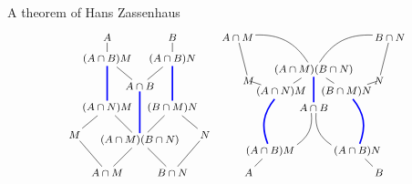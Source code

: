 \documentclass[8pt, handout]{beamer}
\begin{document}
\begin{frame}{A theorem of Hans Zassenhaus}
  \[
  \begin{tikzpicture}[scale=.6]
    \begin{scope}[scale=1,shorten >= -2pt, shorten <= -2pt]
      \tikzstyle{every node}=[font=\footnotesize]
      \node (AM) at (-1.5,0) {$A\cap M$};
      \node (BN) at (1.5,0) {$B\cap N$};
      \node (AMBN) at (0,1.5) {$(A\cap M)(B\cap N)$};
      \node (M) at (-3,1.75) {$M$};
      \node (N) at (3,1.75) {$N$};
      \node (BMN) at (1.5,3) {$(B\cap M)N$};
      \node (ANM) at (-1.5,3) {$(A\cap N)M$};
      \node (AB) at (0,4) {$A\cap B$};
      \node (ABM) at (-1.5,5.25) {$(A\cap B)M$};
      \node (ABN) at (1.5,5.25) {$(A\cap B)N$};
      \node (A) at (-1.5,6.25) {$A$};
      \node (B) at (1.5,6.25) {$B$};
      \draw (AM) to (M); \draw (BN) to (N);
      \draw (AM) to (AMBN); 
      \draw (BN) to (AMBN);
      \draw (ANM) to (AMBN); \draw (BMN) to (AMBN);
      \draw [very thick,eBlue] (AB) to (AMBN);
      \draw (M) to (ANM); \draw (N) to (BMN);
      \draw (ABM) to (AB);
      \draw (ABN) to (AB);
      \draw [very thick,eBlue] (ABM) to (ANM);
      \draw [very thick,eBlue] (ABN) to (BMN);
      \draw (A) -- (ABM); \draw (B) -- (ABN); 
    \end{scope}
    \begin{scope}[shift={(8,0)},scale=1,shorten >= -2pt, shorten <= -2pt]
      \tikzstyle{every node}=[font=\footnotesize]
      \node (AM) at (-3.5,6.25) {$A\cap M$};
      \node (BN) at (3.5,6.25) {$B\cap N$};
      \node (AMBN) at (0,4.75) {$(A\cap M)(B\cap N)$};
      \node (M) at (-3,4.25) {$M$};
      \node (N) at (3,4.25) {$N$};
      \node (BMN) at (1.5,3.75) {$(B\cap M)N$};
      \node (ANM) at (-1.5,3.75) {$(A\cap N)M$};
      \node (AB) at (0,3) {$A\cap B$};
      \node (ABM) at (-2,1) {$(A\cap B)M$};
      \node (ABN) at (2,1) {$(A\cap B)N$};
      \node (A) at (-3,0) {$A$};
      \node (B) at (3,0) {$B$};
      \draw (AM) to (M); \draw (BN) to (N);
      \draw (AM) to [bend left] (AMBN); 
      \draw (BN) to [bend right] (AMBN);
      \draw (ANM) to (AMBN); \draw (BMN) to (AMBN);
      \draw [very thick,eBlue] (AB) to (AMBN);
      \draw (M) to (ANM); \draw (N) to (BMN);
      \draw (ABM) to [bend right] (AB);
      \draw (ABN) to [bend left] (AB);
      \draw [very thick,eBlue] (ABM) to [bend left] (ANM);
      \draw [very thick,eBlue] (ABN) to [bend right] (BMN);
      \draw (A) -- (ABM); \draw (B) -- (ABN); 
    \end{scope}
  \end{tikzpicture}
  \]
  
\end{frame}
\end{document}

